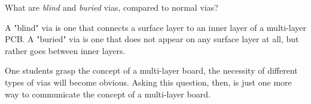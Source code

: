 

What are {\it blind} and {\it buried} vias, compared to normal vias?







A "blind" via is one that connects a surface layer to an inner layer of a multi-layer PCB.  A "buried" via is one that does not appear on any surface layer at all, but rather goes between inner layers.







One students grasp the concept of a multi-layer board, the necessity of different types of vias will become obvious.  Asking this question, then, is just one more way to communicate the concept of a multi-layer board.




